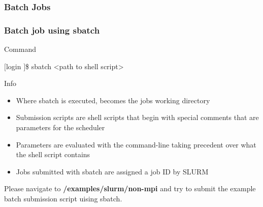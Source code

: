 \subsubsection{Batch Jobs}
\begin{frame}
  \frametitle{Batch job using sbatch}
  \begin{block}{Command}
		\begin{semiverbatim}$[$login \ctilde$]$\$ sbatch <path to shell script>\end{semiverbatim}	
  \end{block}
  \begin{block}{Info}
		\begin{itemize}
		\item Where sbatch is executed, becomes the jobs working directory
		\item Submission scripts are shell scripts that begin with special comments that are parameters for the scheduler
		\item Parameters are evaluated with the command-line taking precedent over what the shell script contains
                \item Jobs submitted with sbatch are assigned a job ID by SLURM
		\end{itemize}
	\end{block}
	  \btVFill
  \begin{center}Please navigate to \textbf{\ctilde/examples/slurm/non-mpi} and try to submit the example batch submission script uising sbatch.\end{center}
\end{frame}


